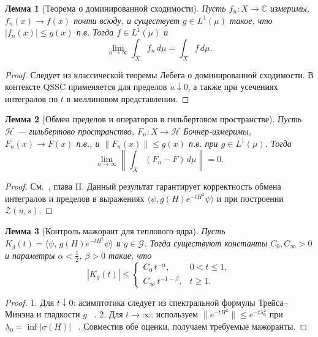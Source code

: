 \documentclass{article}
\numberwithin{equation}{section}
\theoremstyle{plain}
\newtheorem{lemma}{Лемма}
\theoremstyle{definition}
\theoremstyle{remark}
\def\alpha{α}\def\beta{β}\def\gamma{γ}\def\Gamma{Γ}%
\def\infty{∞}\def\partial{∂}\def\sum{Σ}\def\int{∫}%
\begin{document}
\begin{lemma}[Теорема о доминированной сходимости]
\label{lemma:dct}
Пусть $f_n:X\to\mathbb C$ измеримы, $f_n(x)\to f(x)$ почти всюду,  
и существует $g\in L^1(\mu)$ такое, что $|f_n(x)|\le g(x)$ п.в.  
Тогда $f\in L^1(\mu)$ и
\begin{equation}
\lim_{n\to\infty}\int_X f_n\,d\mu = \int_X f\,d\mu.
\end{equation}
\end{lemma}

\begin{proof}
Следует из классической теоремы Лебега о доминированной сходимости.  
В контексте QSSC применяется для пределов $u\downarrow0$, а также при усечениях интегралов по $t$ в меллиновом представлении.
\end{proof}

\begin{lemma}[Обмен пределов и операторов в гильбертовом пространстве]
\label{lemma:bochner}
Пусть $\mathcal H$ — гильбертово пространство, $F_n:X\to\mathcal H$ Бочнер-измеримы,  
$F_n(x)\to F(x)$ п.в., и $\|F_n(x)\|\le g(x)$ п.в. при $g\in L^1(\mu)$.  
Тогда
\begin{equation}
\lim_{n\to\infty}\left\|\int_X (F_n-F)\,d\mu\right\|=0.
\end{equation}
\end{lemma}

\begin{proof}
См.~\cite{ReedSimonI}, глава II.  
Данный результат гарантирует корректность обмена интегралов и пределов в выражениях $\langle \psi, g(H)e^{-tH^2}\psi\rangle$ и при построении $\mathcal Z(u,s)$.
\end{proof}

\begin{lemma}[Контроль мажорант для теплового ядра]
\label{lemma:heat-majorants}
Пусть $K_g(t)=\langle\psi,\,g(H)e^{-tH^2}\psi\rangle$ и $g\in\mathcal G$.  
Тогда существуют константы $C_0,C_\infty>0$ и параметры $\alpha<\frac12$, $\beta>0$ такие, что
\begin{equation}
|K_g(t)| \le
\begin{cases}
C_0\,t^{-\alpha}, & 0<t\le1,\\[4pt]
C_\infty\,t^{-1-\beta}, & t\ge1.
\end{cases}
\end{equation}
\end{lemma}

\begin{proof}
1. Для $t\downarrow0$: асимптотика следует из спектральной формулы Трейса–Минэна и гладкости $g$ ~\cite{Minakshisundaram1949}.  
2. Для $t\to\infty$: используем $\|e^{-tH^2}\|\le e^{-t\lambda_0^2}$ при $\lambda_0=\inf|\sigma(H)|$ ~\cite{Davies1995}.  
Совместив обе оценки, получаем требуемые мажоранты.
\end{proof}
\end{document}
